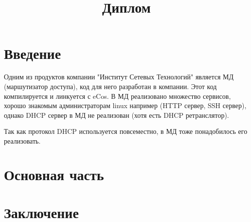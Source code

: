 \documentclass[12pt]{article}
\title{Диплом}
\begin{document}
\maketitle

\section{Введение}


Одним из продуктов компании "Институт Сетевых Технологий" является МД (маршутизатор доступа), код для него разработан в компании. Этот код компилируется и линкуется с eCos. В МД реализовано множество сервисов, хорошо знакомым администраторам linux например (HTTP сервер, SSH сервер), однако DHCP сервер в МД не реализован (хотя есть DHCP ретранслятор).

Так как протокол DHCP используется повсеместно, в МД тоже понадобилось его реализовать.

\section{Основная часть}

\section{Заключение}
\end{document}
